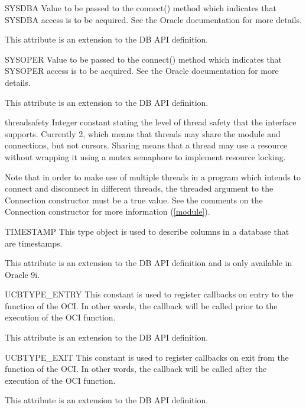 \documentclass{manual}
\begin{document}
\begin{datadesc}{SYSDBA}
  Value to be passed to the connect() method which indicates that SYSDBA
  access is to be acquired. See the Oracle documentation for more details.

   This attribute is an extension to the DB API definition.
\end{datadesc}

\begin{datadesc}{SYSOPER}
  Value to be passed to the connect() method which indicates that SYSOPER
  access is to be acquired. See the Oracle documentation for more details.

   This attribute is an extension to the DB API definition.
\end{datadesc}

\begin{datadesc}{threadsafety}
  Integer constant stating the level of thread safety that the interface
  supports. Currently 2, which means that threads may share the module and
  connections, but not cursors. Sharing means that a thread may use a resource
  without wrapping it using a mutex semaphore to implement resource locking.

  Note that in order to make use of multiple threads in a program which intends
  to connect and disconnect in different threads, the threaded argument to the
  Connection constructor must be a true value. See the comments on the
  Connection constructor for more information (\ref{module}).
\end{datadesc}

\begin{datadesc}{TIMESTAMP}
  This type object is used to describe columns in a database that are
  timestamps.

   This attribute is an extension to the DB API definition and
  is only available in Oracle 9i.
\end{datadesc}

\begin{datadesc}{UCBTYPE_ENTRY}
  This constant is used to register callbacks on entry to the function
  of the OCI. In other words, the callback will be called prior to the
  execution of the OCI function.

   This attribute is an extension to the DB API definition.
\end{datadesc}

\begin{datadesc}{UCBTYPE_EXIT}
  This constant is used to register callbacks on exit from the function
  of the OCI. In other words, the callback will be called after the execution
  of the OCI function.

   This attribute is an extension to the DB API definition.
\end{datadesc}
\end{document}
